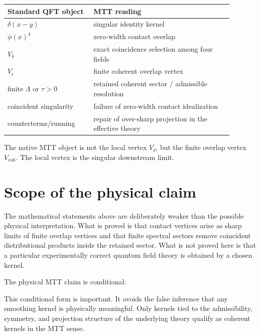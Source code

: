 \documentclass[11pt]{article}
\begin{document}
\begin{center}
\begin{tabular}{p{0.34\linewidth}p{0.55\linewidth}}
\hline
\textbf{Standard QFT object} & \textbf{MTT reading}\\
\hline
\(\delta(x-y)\) & singular identity kernel\\
\(\phi(x)^4\) & zero-width contact overlap\\
\(V_\delta\) & exact coincidence selection among four fields\\
\(V_\epsilon\) & finite coherent overlap vertex\\
finite \(\Lambda\) or \(\tau>0\) & retained coherent sector / admissible resolution\\
coincident singularity & failure of zero-width contact idealization\\
counterterms/running & repair of over-sharp projection in the effective theory\\
\hline
\end{tabular}
\end{center}

The native MTT object is not the local vertex \(V_\delta\), but the finite overlap vertex
\(V_{\mathrm{coh}}\).  The local vertex is the singular downstream limit.

\section{Scope of the physical claim}

The mathematical statements above are deliberately weaker than the possible physical
interpretation.  What is proved is that contact vertices arise as sharp limits of finite overlap
vertices and that finite spectral sectors remove coincident distributional products inside the
retained sector.  What is not proved here is that a particular experimentally correct quantum
field theory is obtained by a chosen kernel.

The physical MTT claim is conditional:

\begin{center}
\end{center}

This conditional form is important.  It avoids the false inference that any smoothing kernel is
physically meaningful.  Only kernels tied to the admissibility, symmetry, and projection
structure of the underlying theory qualify as coherent kernels in the MTT sense.
\end{document}
